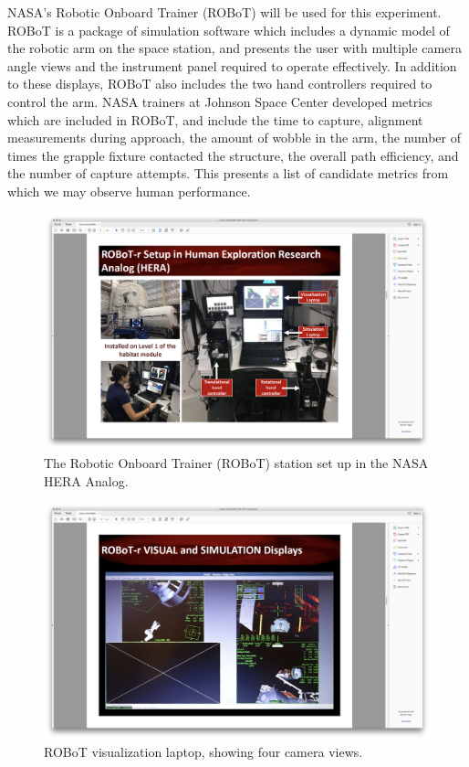 \documentclass{paper}
\begin{document}
NASA’s Robotic Onboard Trainer (ROBoT) will be used for this experiment.
ROBoT is a package of simulation software which includes a dynamic model of the robotic arm on the space station, and presents the user with multiple camera angle views and the instrument panel required to operate effectively.
In addition to these displays, ROBoT also includes the two hand controllers required to control the arm.
NASA trainers at Johnson Space Center developed metrics which are included in ROBoT, and include the time to capture, alignment measurements during approach, the amount of wobble in the arm, the number of times the grapple fixture contacted the structure, the overall path efficiency, and the number of capture attempts.
This presents a list of candidate metrics from which we may observe human performance.

\begin{figure}[tb!]
    \begin{center}
        \includegraphics[trim={13cm 5cm 22cm 15.5cm},clip,width=\linewidth]{img/Screen Shot 2018-07-26 at 1.43.16 PM.png}
        \caption{The Robotic Onboard Trainer (ROBoT) station set up in the NASA HERA Analog.}
    \end{center}
\end{figure}

\begin{figure}[tb!]
    \begin{center}
        \includegraphics[trim={13cm 5cm 22cm 15.5cm},clip,width=\linewidth]{img/Screen Shot 2018-07-26 at 1.43.02 PM.png}
        \caption{ROBoT visualization laptop, showing four camera views.}
    \end{center}
\end{figure}
\end{document}
